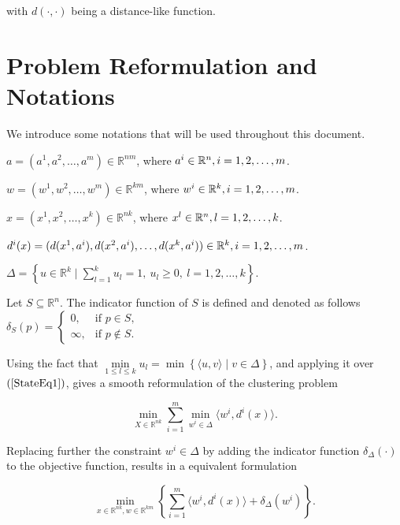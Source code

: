 \documentclass[11pt]{article}
\numberwithin{equation}{section}
\begin{document}
\noindent with $\textit{d}(\cdot ,\cdot)$ being a distance-like function.


\section{Problem Reformulation and Notations}

We introduce some notations that will be used throughout this document.

\noindent $a = (a^1, a^2, \ldots , a^m) \in \mathbb{R}^{nm}$, where $a^i \in \mathbb{R}^n,\smallskip i=1, 2, \ldots , m$.

\noindent $w = (w^1, w^2, \ldots , w^m) \in \mathbb{R}^{km}$, where $w^i \in \mathbb{R}^k,\smallskip i=1, 2, \ldots , m$.

\noindent $x = (x^1, x^2, \ldots , x^k) \in \mathbb{R}^{nk}$, where $x^l \in \mathbb{R}^n,\smallskip l=1, 2, \ldots , k$.

\noindent $d^{i}(x) = (d(x^1,a^i), d(x^2,a^i), \ldots , d(x^k,a^i)) \in \mathbb{R}^k,\smallskip i=1, 2, \ldots , m$.

\noindent $\Delta = \left\lbrace u \in \mathbb{R}^k \mid \sum\limits_{l=1}^{k} u_l = 1, \: u_l \geq 0 , \: l=1, 2, \ldots ,k \right\rbrace$.

\noindent Let $S \subseteq \mathbb{R}^n$. The indicator function of $S$ is defined and denoted as follows $\delta_S(p) = \begin{cases} 0, &\mbox{if } p \in S, \\ 
\infty, &\mbox{if } p \not\in S. \end{cases}$

Using the fact that $\min\limits_{1 \leq l \leq k} u_l = \min \left\lbrace \langle u,v \rangle \mid v \in \Delta \right\rbrace$, and applying it over $\left(\ref{StateEq1}\right)$, gives a smooth reformulation of the clustering problem

\begin{equation}
	\min\limits_{X \in \mathbb{R}^{nk}} \sum\limits_{i=1}^{m} \min\limits_{w^i \in \Delta} \langle w^i , d^i(x) \rangle. \label{StateEq2}
\end{equation}

Replacing further the constraint $w^i \in \Delta$ by adding the indicator function $\delta_{\Delta}(\cdot)$ to the objective function, results in a equivalent formulation

\begin{equation}
	\min\limits_{x \in \mathbb{R}^{nk} , w \in \mathbb{R}^{km}} \left\lbrace \sum\limits_{i=1}^{m} \langle w^i , d^i(x) \rangle + \delta_{\Delta}(w^i) \right\rbrace . \label{StateEq3}
\end{equation}
\end{document}
